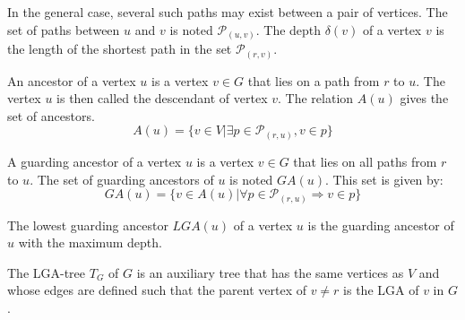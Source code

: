 In the general case, several such paths may exist between a pair of vertices.
The set of paths between $u$ and $v$ is noted $\mathcal{P}_{(u,v)}$.
The depth $\delta(v)$ of a vertex $v$ is the length of the shortest path in the set $\mathcal{P}_{(r,v)}$.
\begin{definition}
	An ancestor of a vertex $u$ is a vertex $v \in G$ that lies on a path from $r$ to $u$. The vertex $u$ is then called the descendant of vertex $v$.
	The relation $A(u)$ gives the set of ancestors.
	\begin{equation*}
		A(u)=\{v\in V|\exists p\in \mathcal{P}_{(r,u)}, v \in p\}
	\end{equation*}
\end{definition}

\begin{definition}
	A guarding ancestor of a vertex $u$ is a vertex $v \in G$ that lies on all paths from $r$ to $u$.
	The set of guarding ancestors of $u$ is noted $\mathit{GA}(u)$.
	This set is given by:
	\begin{equation*}
		\mathit{GA}(u) =	\{v\in A(u)|\forall p\in \mathcal{P}_{(r,u)}\Rightarrow v\in p\}
	\end{equation*}
\end{definition}

\begin{definition}
	The lowest guarding ancestor $LGA(u)$ of a vertex $u$ is the guarding ancestor of $u$ with the maximum depth.
\end{definition}

\begin{definition}
	The LGA-tree $T_G$ of $G$  is an auxiliary tree that has the same vertices as $V$ and whose edges are defined such that the parent vertex of $v \neq r$ is the LGA of $v$ in $G$.
\end{definition}

